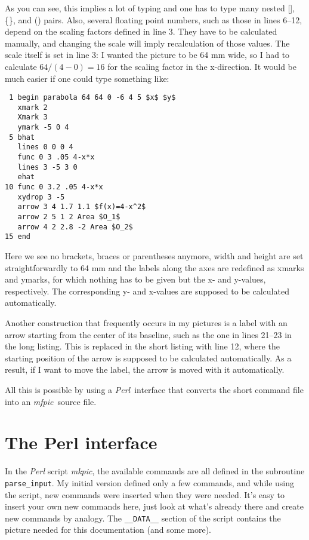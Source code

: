 \documentclass[a4paper,twocolumn]{article}
\def\Mfpic{\textsl{mfpic}}
\def\Mkpic{\textsl{mkpic}}
\def\Perl{\textsl{Perl}}
\begin{document}
As you can see, this implies a lot of typing and one has to type many
nested [], \{\}, and () pairs. Also, several floating point numbers,
such as those in lines 6--12, depend on the scaling factors defined in
line 3. They have to be calculated manually, and changing the scale will
imply recalculation of those values. The scale itself is set in line 3:
I wanted the picture to be 64 mm wide, so I had to calculate
$64/(4-0)=16$ for the scaling factor in the x-direction. It would be
much easier if one could type something like:

\footnotesize
\begin{verbatim}
 1 begin parabola 64 64 0 -6 4 5 $x$ $y$
   xmark 2
   Xmark 3
   ymark -5 0 4
 5 bhat
   lines 0 0 0 4
   func 0 3 .05 4-x*x
   lines 3 -5 3 0
   ehat
10 func 0 3.2 .05 4-x*x
   xydrop 3 -5
   arrow 3 4 1.7 1.1 $f(x)=4-x^2$
   arrow 2 5 1 2 Area $O_1$
   arrow 4 2 2.8 -2 Area $O_2$
15 end
   \end{verbatim}
\normalsize

Here we see no brackets, braces or parentheses anymore, width and
height are set straightforwardly to 64 mm and the labels along the
axes are redefined as xmarks and ymarks, for which nothing has to be
given but the x- and y-values, respectively. The corresponding y- and
x-values are supposed to be calculated automatically. 

Another construction that frequently occurs in my pictures is a label
with an arrow starting from the center of its baseline, such as the
one in lines 21--23 in the long listing. This is replaced in the short
listing with line 12, where the starting position of the arrow is
supposed to be calculated automatically. As a result, if I want to
move the label, the arrow is moved with it automatically.

All this is possible by using a \Perl\ interface that converts the
short command file into an \Mfpic\ source file.

\section{The Perl interface}

In the \Perl{} script \Mkpic{}, the available commands are all defined
in the subroutine \verb|parse_input|. My initial version defined only a
few commands, and while using the script, new commands were inserted
when they were needed. It's easy to insert your own new commands here,
just look at what's already there and create new commands by analogy.
The \verb|__DATA__| section of the script contains the picture needed
for this documentation (and some more).
\end{document}
